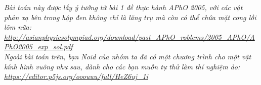 \textit{Bài toán này được lấy ý tưởng từ bài 1 đề thực hành APhO 2005, với các vật phản xạ bên trong hộp đen không chỉ là lăng trụ mà còn có thể chứa mặt cong lồi lõm nữa: \\
\url{http://asianphysicsolympiad.org/download/past_APhO_roblems/2005_APhO/APhO2005_exp_sol.pdf}
\\
Ngoài bài toán trên, bạn Noid của nhóm ta đã có một chương trình cho một vật kính hình vuông như sau, dành cho các bạn muốn tự thử làm thí nghiệm ảo:
\\
\url{https://editor.p5js.org/ooouuu/full/HeZ6uj_1i}
}